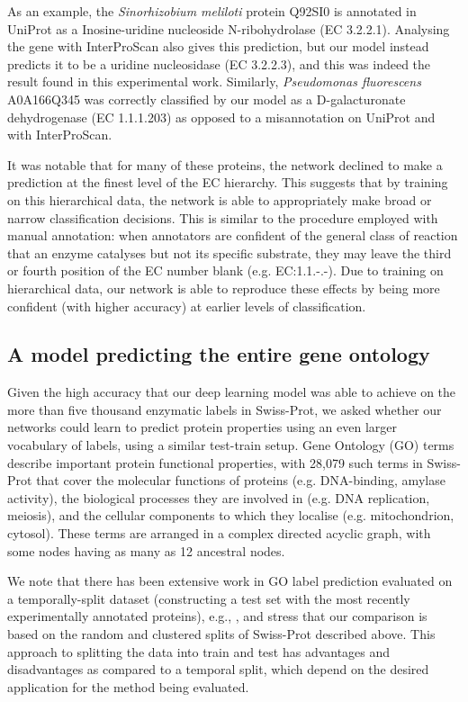 As an  example, the \textit{Sinorhizobium meliloti} protein Q92SI0 is annotated in UniProt as a Inosine-uridine nucleoside N-ribohydrolase (EC 3.2.2.1).  Analysing the gene with InterProScan \citep{interproscan} also gives this prediction, but our model instead predicts it to be a uridine nucleosidase (EC 3.2.2.3), and this was indeed the result found in this experimental work. Similarly, \textit{Pseudomonas fluorescens} A0A166Q345 was correctly classified by our model as a D-galacturonate dehydrogenase (EC 1.1.1.203) as opposed to a misannotation on UniProt and with InterProScan.


It was notable that for many of these proteins, the network declined to make a prediction at the finest level of the EC hierarchy. This suggests that by training on this hierarchical data, the network is able to appropriately make broad or narrow classification decisions. This is similar to the procedure employed with manual annotation: when annotators are confident of the general class of reaction that an enzyme catalyses but not its specific substrate, they may leave the third or fourth position of the EC number blank (e.g. EC:1.1.-.-). Due to training on hierarchical data, our network is able to reproduce these effects by being more confident (with higher accuracy) at earlier levels of classification.

\subsection*{A model predicting the entire gene ontology}
Given the high accuracy that our deep learning model was able to achieve on the more than five thousand enzymatic labels in Swiss-Prot, we asked whether our networks could learn to predict protein properties using an even larger vocabulary of labels, using a similar test-train setup. Gene Ontology \citep{ashburner2000gene, gene2019gene, carbon2009amigo} (GO) terms describe important protein functional properties, with 28,079 such terms in Swiss-Prot that cover the molecular functions of proteins (e.g. DNA-binding, amylase activity), the biological processes they are involved in (e.g. DNA replication, meiosis), and the cellular components to which they localise (e.g. mitochondrion, cytosol). These terms are arranged in a complex directed acyclic graph, with some nodes having as many as 12 ancestral nodes.

We note that there has been extensive work in GO label prediction evaluated on a temporally-split dataset (constructing a test set with the most recently experimentally annotated proteins), e.g., \citep{zhou2019cafa}, and stress that our comparison is based on the random and clustered splits of Swiss-Prot described above.  This approach to splitting the data into train and test has advantages and disadvantages as compared to a temporal split, which depend on the desired application for the method being evaluated.

